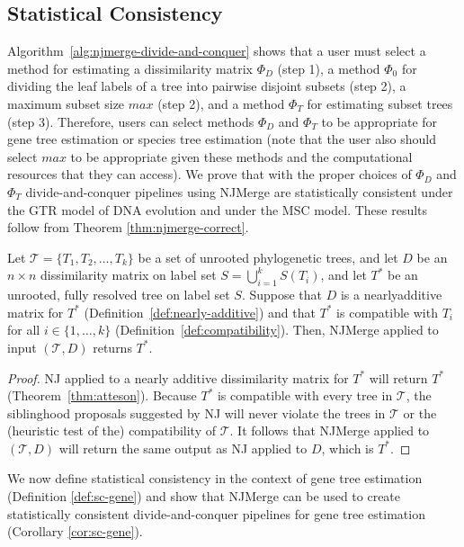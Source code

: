 \subsection{Statistical Consistency}
Algorithm~\ref{alg:njmerge-divide-and-conquer} shows that a user must select a method for estimating a dissimilarity matrix $\Phi_D$ (step 1), a method $\Phi_0$ for dividing the leaf labels of a tree into pairwise disjoint subsets (step 2), a maximum subset size $max$ (step 2),  and a method $\Phi_T$ for estimating subset trees (step 3).
Therefore, users can select methods $\Phi_D$ and $\Phi_T$ to be appropriate for gene tree estimation or species tree estimation (note that the user also should select $max$ to be appropriate given these methods and the computational resources that they can access).
We prove that with the proper choices of $\Phi_D$ and $\Phi_T$ divide-and-conquer pipelines using NJMerge are statistically consistent under the \gls{GTR} model of DNA evolution and under the MSC model.
These results follow from Theorem \ref{thm:njmerge-correct}.

\begin{theorem}
\label{thm:njmerge-correct}
Let $\mathcal{T} = \{T_1, T_2, \dots, T_k \}$ be a set of unrooted phylogenetic trees, and let $D$ be an $n \times n$ dissimilarity matrix on label set $S = \bigcup_{i=1}^k S(T_i)$, and let $T^*$ be an unrooted, fully resolved tree on label set $S$.
Suppose that $D$ is a \gls{nearlyadditive} matrix for $T^*$ (Definition~\ref{def:nearly-additive}) and that $T^*$ is compatible with $T_i$ for all $i \in \{1, \dots, k\}$ (Definition~\ref{def:compatibility}).
Then, NJMerge applied to input $(\mathcal{T}, D)$ returns $T^*$.
\end{theorem}
\begin{proof}
NJ applied to a nearly additive dissimilarity matrix for $T^*$ will return $T^*$ (Theorem~\ref{thm:atteson}).
Because $T^*$ is compatible with every tree in $\mathcal{T}$, the siblinghood proposals suggested by NJ will never violate the trees in $\mathcal{T}$ or the (heuristic test of the) compatibility of $\mathcal{T}$.
It follows that NJMerge applied to $(\mathcal{T}, D)$ will return the same output as NJ applied to $D$, which is $T^*$.
\end{proof}

We now define statistical consistency in the context of gene tree estimation (Definition \ref{def:sc-gene}) and show that NJMerge can be used to create statistically consistent divide-and-conquer pipelines for gene tree estimation (Corollary \ref{cor:sc-gene}).

